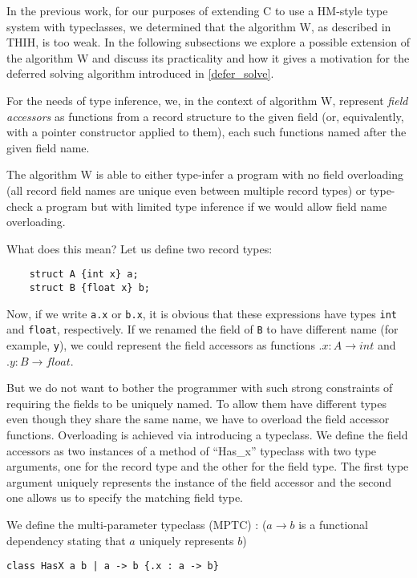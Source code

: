 In the previous work, for our purposes of extending C to use a HM-style type system with typeclasses, we determined that the algorithm W, as described in THIH, is too weak. In the following subsections we explore a possible extension of the algorithm W and discuss its practicality and how it gives a motivation for the deferred solving algorithm introduced in \cref{defer_solve}.

For the needs of type inference, we, in the context of algorithm W, represent \emph{field accessors} as functions from a record structure to the given field (or, equivalently, with a pointer constructor applied to them), each such functions named after the given field name.

The algorithm W is able to either type-infer a program with no field overloading (all record field names are unique even between multiple record types) or type-check a program but with limited type inference if we would allow field name overloading.

What does this mean? Let us define two record types:

\begin{lstlisting}
    struct A {int x} a;
    struct B {float x} b;
\end{lstlisting}

Now, if we write \lstinline{a.x} or \lstinline{b.x}, it is obvious that these expressions have types \lstinline{int} and \lstinline{float}, respectively. If we renamed the field of \lstinline{B} to have different name (for example, \lstinline{y}), we could represent the field accessors as functions $.x : A \to int$ and $.y : B \to float$.

But we do not want to bother the programmer with such strong constraints of requiring the fields to be uniquely named. To allow them have different types even though they share the same name, we have to overload the field accessor functions. Overloading is achieved via introducing a typeclass. We define the field accessors as two instances of a method  of ``Has\_x'' typeclass with two type arguments, one for the record type and the other for the field type. The first type argument uniquely represents the instance of the field accessor and the second one allows us to specify the matching field type.

We define the multi-parameter typeclass (MPTC) : ($a \to b$ is a functional dependency stating that $a$ uniquely represents $b$)

\begin{center}
    \lstinline/class HasX a b | a -> b {.x : a -> b}/
\end{center}

